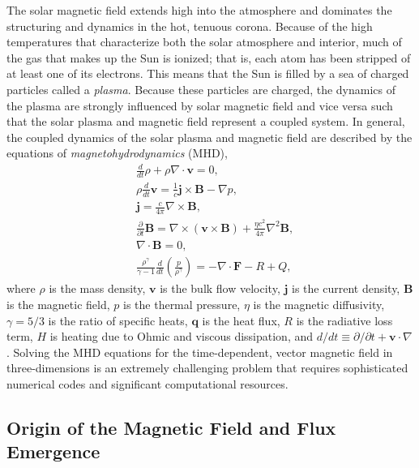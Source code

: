 The solar magnetic field extends high into the atmosphere and dominates the structuring and dynamics in the hot, tenuous corona. Because of the high temperatures that characterize both the solar atmosphere and interior, much of the gas that makes up the Sun is ionized; that is, each atom has been stripped of at least one of its electrons. This means that the Sun is filled by a sea of charged particles called a \textit{plasma}. Because these particles are charged, the dynamics of the plasma are strongly influenced by solar magnetic field and vice versa such that the solar plasma and magnetic field represent a coupled system. In general, the coupled dynamics of the solar plasma and magnetic field are described by the equations of \textit{magnetohydrodynamics} (MHD),
\begin{align}
    &\frac{d}{dt}\rho + \rho\nabla\cdot\mathbf{v} = 0, \label{eq:mhd_continuity} \\
    &\rho\frac{d}{dt}\mathbf{v} = \frac{1}{c}\mathbf{j}\times\mathbf{B} - \nabla p, \label{eq:mhd_momentum} \\
    &\mathbf{j} = \frac{c}{4\pi}\nabla\times\mathbf{B}, \label{eq:mhd_ampere} \\
    &\frac{\partial}{\partial t}\mathbf{B} = \nabla\times(\mathbf{v}\times\mathbf{B}) + \frac{\eta c^2}{4\pi}\nabla^2\mathbf{B}, \label{eq:mhd_faraday} \\
    &\nabla\cdot\mathbf{B} = 0, \label{eq:mhd_divb} \\
    &\frac{\rho^\gamma}{\gamma - 1}\frac{d}{dt}\left(\frac{p}{\rho^{\gamma}}\right) = -\nabla\cdot\mathbf{F} - R + Q, \label{eq:mhd_energy}
\end{align}
where $\rho$ is the mass density, $\mathbf{v}$ is the bulk flow velocity, $\mathbf{j}$ is the current density, $\mathbf{B}$ is the magnetic field, $p$ is the thermal pressure, $\eta$ is the magnetic diffusivity, $\gamma=5/3$ is the ratio of specific heats, $\mathbf{q}$ is the heat flux, $R$ is the radiative loss term, $H$ is heating due to Ohmic and viscous dissipation, and $d/dt\equiv\partial/\partial t + \mathbf{v}\cdot\nabla$ \citep{priest_magnetohydrodynamics_2014}. Solving the MHD equations for the time-dependent, vector magnetic field in three-dimensions is an extremely challenging problem that requires sophisticated numerical codes and significant computational resources.

\subsection{Origin of the Magnetic Field and Flux Emergence}\label{sec:magnetic-origins}

